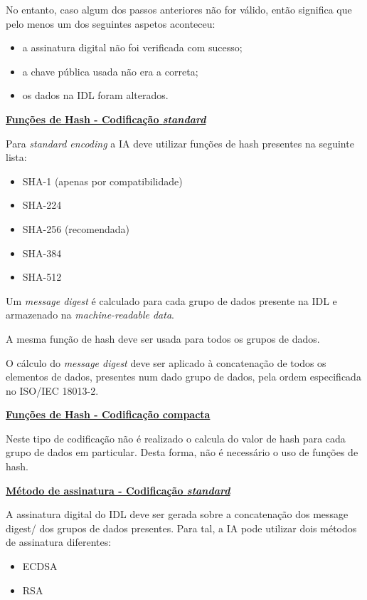 No entanto, caso algum dos passos anteriores não for válido, então significa
que pelo menos um dos seguintes aspetos aconteceu:
\begin{itemize}
\item a assinatura digital não foi verificada com sucesso;
\item a chave pública usada não era a correta;
\item os dados na IDL foram alterados.
\end{itemize}


\vspace{0.6cm}
\underline{\textbf{Funções de Hash - Codificação \emph{standard}}}
\vspace{0.3cm}

Para \emph{standard encoding} a IA deve utilizar funções de hash presentes na
seguinte lista:
\begin{itemize}
\item SHA-1 (apenas por compatibilidade)
\item SHA-224
\item SHA-256 (recomendada)
\item SHA-384
\item SHA-512
\end{itemize}

Um \emph{message digest} é calculado para cada grupo de dados presente na IDL e
armazenado na \emph{machine-readable data}.

A mesma função de hash deve ser usada para todos os grupos de dados.

O cálculo do \emph{message digest} deve ser aplicado à concatenação de todos os
elementos de dados, presentes num dado grupo de dados, pela ordem
especificada no ISO/IEC 18013-2.


\vspace{0.6cm}
\underline{\textbf{Funções de Hash - Codificação compacta}}
\vspace{0.3cm}

Neste tipo de codificação não é realizado o calcula do valor de hash para
cada grupo de dados em particular. Desta forma, não é necessário o uso de
funções de hash.


\vspace{0.6cm}
\underline{\textbf{Método de assinatura - Codificação \emph{standard}}}
\vspace{0.3cm}

A assinatura digital do IDL deve ser gerada sobre a concatenação dos
message digest/ dos grupos de dados presentes. Para tal, a IA pode utilizar
dois métodos de assinatura diferentes:
\begin{itemize}
\item ECDSA
\item RSA
\end{itemize}

